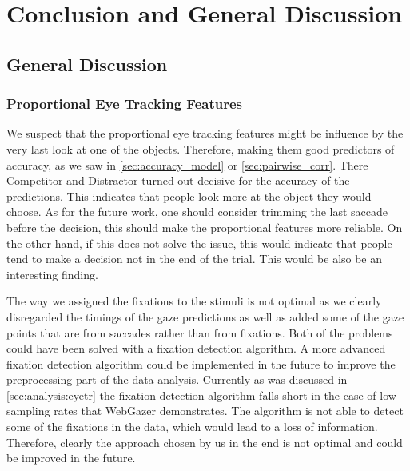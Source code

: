 ﻿\chapter{Conclusion and General Discussion}
\label{sec:conclusion}




\section{General Discussion}
\label{sec:general-discussion}

\subsection{Proportional Eye Tracking Features}
\label{sec:general-discussion:proportional-eye-tracking-features}
We suspect that the proportional eye tracking features might be influence by the very last look at one of the objects. Therefore, making them good predictors of accuracy, as we saw in \autoref{sec:accuracy_model} or \autoref{sec:pairwise_corr}. There Competitor and Distractor turned out decisive for the accuracy of the predictions. This indicates that people look more at the object they would choose. As for the future work, one should consider trimming the last saccade before the decision, this should make the proportional features more reliable. On the other hand, if this does not solve the issue, this would indicate that people tend to make a decision not in the end of the trial. This would be also be an interesting finding.

The way we assigned the fixations to the stimuli is not optimal as we clearly disregarded the timings of the gaze predictions as well as added some of the gaze points that are from saccades rather than from fixations. Both of the problems could have been solved with a fixation detection algorithm. A more advanced fixation detection algorithm could be implemented in the future to improve the preprocessing part of the data analysis. Currently as was discussed in \autoref{sec:analysis:eyetr} the fixation detection algorithm falls short in the case of low sampling rates that WebGazer demonstrates. The algorithm is not able to detect some of the fixations in the data, which would lead to a loss of information. Therefore, clearly the approach chosen by us in the end is not optimal and could be improved in the future.

